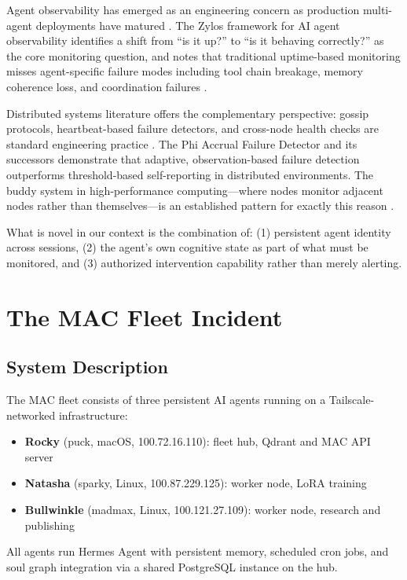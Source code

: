 \documentclass[11pt]{article}
\begin{document}
Agent observability has emerged as an engineering concern as production multi-agent deployments have matured \cite{zylos2026}. The Zylos framework for AI agent observability identifies a shift from ``is it up?'' to ``is it behaving correctly?'' as the core monitoring question, and notes that traditional uptime-based monitoring misses agent-specific failure modes including tool chain breakage, memory coherence loss, and coordination failures \cite{zylos2026}.

Distributed systems literature offers the complementary perspective: gossip protocols, heartbeat-based failure detectors, and cross-node health checks are standard engineering practice \cite{heartbeat2024}. The Phi Accrual Failure Detector \cite{hayashibara2004} and its successors demonstrate that adaptive, observation-based failure detection outperforms threshold-based self-reporting in distributed environments. The buddy system in high-performance computing---where nodes monitor adjacent nodes rather than themselves---is an established pattern for exactly this reason \cite{geekworkbench2024}.

What is novel in our context is the combination of: (1) persistent agent identity across sessions, (2) the agent's own cognitive state as part of what must be monitored, and (3) authorized intervention capability rather than merely alerting.

\section{The MAC Fleet Incident}

\subsection{System Description}

The MAC fleet consists of three persistent AI agents running on a Tailscale-networked infrastructure:
\begin{itemize}
  \item \textbf{Rocky} (puck, macOS, 100.72.16.110): fleet hub, Qdrant and MAC API server
  \item \textbf{Natasha} (sparky, Linux, 100.87.229.125): worker node, LoRA training
  \item \textbf{Bullwinkle} (madmax, Linux, 100.121.27.109): worker node, research and publishing
\end{itemize}

All agents run Hermes Agent \cite{nousresearch2026} with persistent memory, scheduled cron jobs, and soul graph integration via a shared PostgreSQL instance on the hub.
\end{document}
